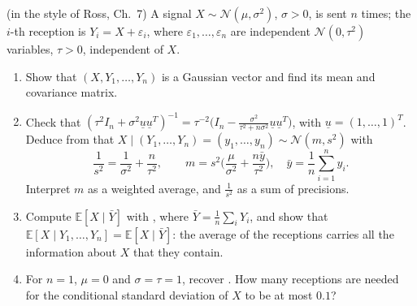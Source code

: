 \begin{exercise}\label{ex:gc-ross-signal}
\hard (in the style of Ross, Ch.~7) A signal $X\sim\mathcal N(\mu,\sigma^2)$, $\sigma>0$, is sent $n$
times; the $i$-th reception is $Y_i=X+\varepsilon_i$, where $\varepsilon_1,\dots,\varepsilon_n$ are
independent $\mathcal N(0,\tau^2)$ variables, $\tau>0$, independent of $X$.
\begin{enumerate}[label=(\alph*)]
  \item Show that $(X,Y_1,\dots,Y_n)$ is a Gaussian vector and find its mean and covariance matrix.
  \item Check that $(\tau^2I_n+\sigma^2\underline u\underline u^T)^{-1}=\tau^{-2}\big(I_n-\frac{\sigma^2}{\tau^2+n\sigma^2}\underline u\underline u^T\big)$,
    with $\underline u=(1,\dots,1)^T$. Deduce from  that
    $X\mid(Y_1,\dots,Y_n)=(y_1,\dots,y_n)\sim\mathcal N(m,s^2)$ with
    \[
      \frac1{s^2}=\frac1{\sigma^2}+\frac n{\tau^2},\qquad
      m=s^2\Big(\frac\mu{\sigma^2}+\frac{n\bar y}{\tau^2}\Big),\quad\bar y=\frac1n\sum_{i=1}^ny_i .
    \]
    Interpret $m$ as a weighted average, and $\frac1{s^2}$ as a sum of precisions.
  \item Compute $\mathbb E[X\mid\bar Y]$ with , where
    $\bar Y=\frac1n\sum_iY_i$, and show that $\mathbb E[X\mid Y_1,\dots,Y_n]=\mathbb E[X\mid\bar Y]$:
    the average of the receptions carries all the information about $X$ that they contain.
  \item For $n=1$, $\mu=0$ and $\sigma=\tau=1$, recover . How many receptions
    are needed for the conditional standard deviation of $X$ to be at most $0.1$?
\end{enumerate}
\end{exercise}

